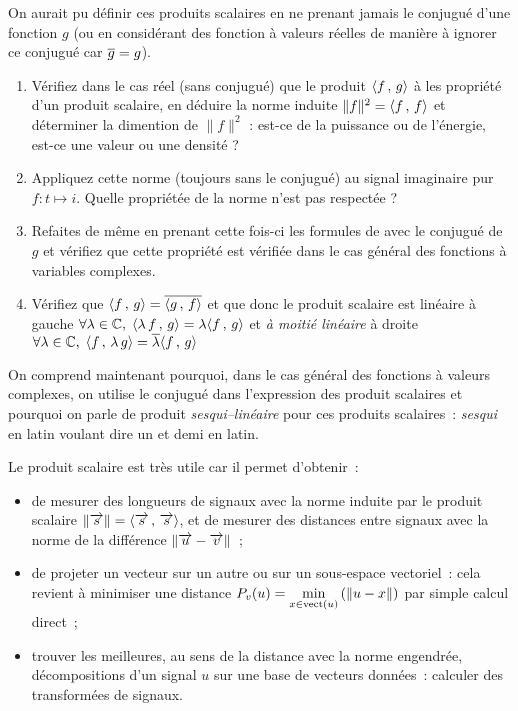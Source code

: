\begin{exercice}
  On aurait pu définir ces produits scalaires en ne prenant jamais le
  conjugué d'une fonction $g$ (ou en considérant des fonction à
  valeurs réelles de manière à ignorer ce conjugué car $\overline{g}=g$).
  \begin{enumerate}
  \item Vérifiez dans le cas réel (sans conjugué) que le produit
    $\langle f\,,\,g\rangle$ à les propriété d'un produit scalaire, en déduire la
    norme induite $\|f\|^2=\langle f\,,\,f\rangle$ et déterminer la dimention de
    $\|f\|^2$ : est-ce de la puissance ou de l'énergie, est-ce une
    valeur ou une densité ?
  \item Appliquez cette norme (toujours sans le conjugué) au signal imaginaire pur
    $f: t\mapsto i$. Quelle propriétée de la norme n'est pas respectée ?
  \item Refaites de même en prenant cette fois-ci les formules de
     avec le conjugué de $g$ et vérifiez que
    cette propriété est vérifiée dans le cas général des fonctions à
    variables complexes.
  \item Vérifiez que $\langle f\,,\,g\rangle=\overline{\langle g\,,\,f\rangle}$ et que donc le produit scalaire est linéaire à gauche $\forall\lambda\in\mathbb{C},\; \langle\lambda\,f\,,\,g\rangle=\lambda\langle f\,,\,g\rangle$ et \emph{à moitié linéaire} à droite $\forall \lambda\in\mathbb{C},\; \langle f\,,\,\lambda\,g\rangle=\overline{\lambda}\langle f\,,\,g\rangle$
  \end{enumerate}
On comprend maintenant pourquoi, dans le cas général des fonctions à valeurs complexes, on utilise le conjugué dans l'expression des produit scalaires et pourquoi on parle de produit \emph{sesqui--linéaire} pour ces produits scalaires~: \emph{sesqui} en latin voulant dire \og{}un et demi\fg{} en latin.  
\end{exercice}

Le produit scalaire est très utile car il permet d'obtenir~:
\begin{itemize}
\item de mesurer des longueurs de signaux avec la norme induite par le produit scalaire $\left\|\overrightarrow{s}\right\|=\langle\overrightarrow{s}\,,\,\overrightarrow{s}\rangle$, et de mesurer des distances entre signaux avec la norme de la différence $\left\|\overrightarrow{u}-\overrightarrow{v}\right\|$~;
\item de projeter un vecteur sur un autre ou sur un sous-espace
  vectoriel~: cela revient à minimiser une distance $P_v(u)=\min\limits_{x\in\mathrm{vect}\left(u\right)}\left(\left\|u-x\right\|\right)$ par simple calcul direct~;
  
\item trouver les meilleures, au sens de la distance avec la norme
  engendrée, décompositions d'un signal $u$ sur une base de vecteurs
  données~: calculer des transformées de signaux.
\end{itemize}

